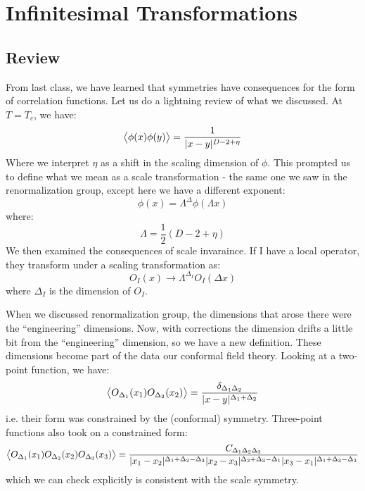 \section{Infinitesimal Transformations}
\subsection{Review}
From last class, we have learned that symmetries have consequences for the form of correlation functions. Let us do a lightning review of what we discussed. At $T = T_c$, we have:
\begin{equation}
    \avg{\phi(x)\phi(y)} = \frac{1}{\abs{x-y}^{D-2+\eta}}
\end{equation}
Where we interpret $\eta$ as a shift in the scaling dimension of $\phi$. This prompted us to define what we mean as a scale transformation - the same one we saw in the renormalization group, except here we have a different exponent:
\begin{equation}
    \phi(x) = \Lambda^\Delta\phi(\Lambda x)
\end{equation}
where:
\begin{equation}
    \Lambda = \frac{1}{2}(D - 2 + \eta)
\end{equation}
We then examined the consequences of scale invaraince. If I have a local operator, they transform under a scaling transformation as:
\begin{equation}
    O_I(x) \to \Lambda^{\Delta_I}O_I(\Delta x)
\end{equation}
where $\Delta_I$ is the dimension of $O_I$.

When we discussed renormalization group, the dimensions that arose there were the ``engineering'' dimensions. Now, with corrections the dimension drifts a little bit from the ``engineering'' dimension, so we have a new definition. These dimensions become part of the data our conformal field theory. Looking at a two-point function, we have:
\begin{equation}
    \left< O_{\Delta_1}(x_1)O_{\Delta_2}(x_2) \right> = \frac{\delta_{\Delta_1\Delta_2}}{\lvert x-y \rvert^{\Delta_1 + \Delta_2}}
\end{equation}
i.e. their form was constrained by the (conformal) symmetry. Three-point functions also took on a constrained form:
\begin{equation}
    \left< O_{\Delta_1}(x_1)O_{\Delta_2}(x_2)O_{\Delta_3}(x_3) \right> = \frac{C_{\Delta_1\Delta_2\Delta_3}}{\lvert x_1 - x_2 \rvert^{\Delta_1 + \Delta_2 - \Delta_3}\lvert x_2-x_3 \rvert^{\Delta_2 + \Delta_3 - \Delta_1}\lvert x_3 - x_1 \rvert^{\Delta_1 + \Delta_3 - \Delta_2}}
\end{equation}
which we can check explicitly is consistent with the scale symmetry.

